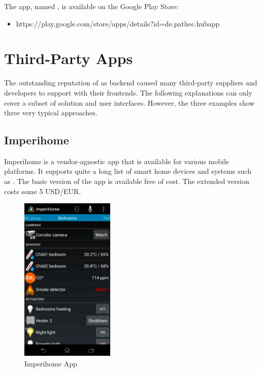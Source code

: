 The app, named , is available on the Google Play Store:

\begin{itemize}
\item https://play.google.com/store/apps/details?id=de.pathec.hubapp
\end{itemize}

\section{Third-Party Apps}

The outstanding reputation of \zway as \zwave backend caused many third-party suppliers 
and developers to support \zway with their frontends. The following explanations can only 
cover a subset of solution and user interfaces. However, the three examples show three 
very typical approaches.

\subsection{Imperihome}

Imperihome is a vendor-agnostic app that is available for various mobile platforms. It 
supports quite a long list of smart home devices and systems such as \zway. The basic 
version of the app is available free of cost. The extended version costs some 5 USD/EUR.

\begin{figure}
\begin{center}
\includegraphics[width=0.4\textwidth]{pngs/cap5/mobile4.png}
\caption{Imperihome App}
\label{mobile4}
\end{center}
\end{figure}

